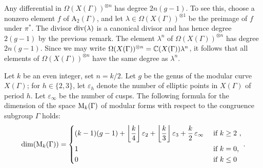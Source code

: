 \begin{rmk}
 Any differential in $\Omega(X(\Gamma))^{\otimes n}$ has degree $2n(g-1)$. To see this, choose a nonzero element $f$ of $\mathrm{A}_2(\Gamma)$, and let $\lambda\in\Omega(X(\Gamma))^{\otimes 1}$ be the preimage of $f$ under $\pi^*$. The divisor $\operatorname{div}(\lambda)$ is a canonical divisor and has hence degree $2(g-1)$ by the previous remark. The element $\lambda^n$ of $\Omega(X(\Gamma))^{\otimes n}$ has degree $2n(g-1)$. Since we may write $\Omega(X(\Gamma))^{\otimes n}=\mathbb{C}(X(\Gamma))\lambda^{n}$, it follows that all elements of $\Omega(X(\Gamma))^{\otimes n}$ have the same degree as $\lambda^{n}$.
\end{rmk}

\begin{thm}
 Let $k$ be an even integer, set $n=k/2$. Let $g$ be the genus of the modular curve $X(\Gamma)$; for $h\in\{2,3\}$, let $\varepsilon_h$ denote the number of elliptic points in $X(\Gamma)$ of period $h$. Let $\varepsilon_\infty$ be the number of cusps. The following formula for the dimension of the space $\mathrm{M}_k(\Gamma)$ of modular forms with respect to the congruence subgroup $\Gamma$ holds:
 \[
  \dim(\mathrm{M}_k(\Gamma))=\begin{dcases}
                      (k-1)(g-1)+\left \lfloor \frac{k}{4} \right\rfloor\varepsilon_2+\left \lfloor \frac{k}{3} \right\rfloor\varepsilon_3+\frac{k}{2}\,\varepsilon_\infty & \text{ if $k\geq 2$ ,}\\
                      1 & \text{ if $k=0$,}\\
                      0 & \text{ if $k\leq 0$}
                     \end{dcases}.
 \]
\end{thm}
